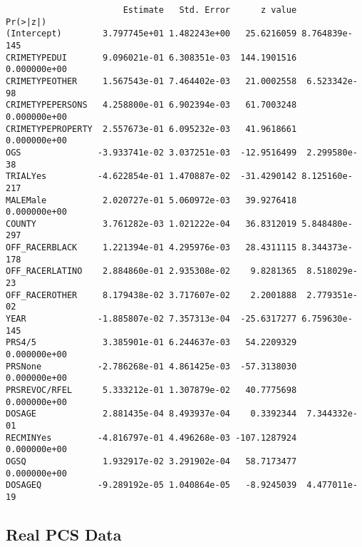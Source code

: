 \documentclass[
  letterpaper,
  DIV=11,
  numbers=noendperiod]{scrartcl}
\newenvironment{Shaded}{\begin{snugshade}}{\end{snugshade}}
\newcommand{\AttributeTok}[1]{\textcolor[rgb]{0.40,0.45,0.13}{#1}}
\newcommand{\FunctionTok}[1]{\textcolor[rgb]{0.28,0.35,0.67}{#1}}
\newcommand{\NormalTok}[1]{\textcolor[rgb]{0.00,0.23,0.31}{#1}}
\newcommand{\OtherTok}[1]{\textcolor[rgb]{0.00,0.23,0.31}{#1}}
\newcommand{\SpecialCharTok}[1]{\textcolor[rgb]{0.37,0.37,0.37}{#1}}
\newcommand{\StringTok}[1]{\textcolor[rgb]{0.13,0.47,0.30}{#1}}
\begin{document}
\begin{verbatim}
                       Estimate   Std. Error      z value      Pr(>|z|)
(Intercept)        3.797745e+01 1.482243e+00   25.6216059 8.764839e-145
CRIMETYPEDUI       9.096021e-01 6.308351e-03  144.1901516  0.000000e+00
CRIMETYPEOTHER     1.567543e-01 7.464402e-03   21.0002558  6.523342e-98
CRIMETYPEPERSONS   4.258800e-01 6.902394e-03   61.7003248  0.000000e+00
CRIMETYPEPROPERTY  2.557673e-01 6.095232e-03   41.9618661  0.000000e+00
OGS               -3.933741e-02 3.037251e-03  -12.9516499  2.299580e-38
TRIALYes          -4.622854e-01 1.470887e-02  -31.4290142 8.125160e-217
MALEMale           2.020727e-01 5.060972e-03   39.9276418  0.000000e+00
COUNTY             3.761282e-03 1.021222e-04   36.8312019 5.848480e-297
OFF_RACERBLACK     1.221394e-01 4.295976e-03   28.4311115 8.344373e-178
OFF_RACERLATINO    2.884860e-01 2.935308e-02    9.8281365  8.518029e-23
OFF_RACEROTHER     8.179438e-02 3.717607e-02    2.2001888  2.779351e-02
YEAR              -1.885807e-02 7.357313e-04  -25.6317277 6.759630e-145
PRS4/5             3.385901e-01 6.244637e-03   54.2209329  0.000000e+00
PRSNone           -2.786268e-01 4.861425e-03  -57.3138030  0.000000e+00
PRSREVOC/RFEL      5.333212e-01 1.307879e-02   40.7775698  0.000000e+00
DOSAGE             2.881435e-04 8.493937e-04    0.3392344  7.344332e-01
RECMINYes         -4.816797e-01 4.496268e-03 -107.1287924  0.000000e+00
OGSQ               1.932917e-02 3.291902e-04   58.7173477  0.000000e+00
DOSAGEQ           -9.289192e-05 1.040864e-05   -8.9245039  4.477011e-19
\end{verbatim}

\hypertarget{real-pcs-data}{%
\subsection{Real PCS Data}\label{real-pcs-data}}

\begin{Shaded}
\end{Shaded}
\end{document}
